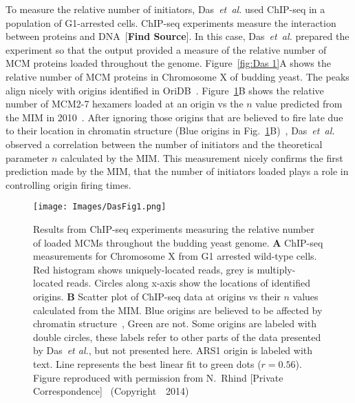 {		To measure the relative number of initiators, Das~\emph{et~al.} used ChIP-seq in a population of G1-arrested cells.
		ChIP-seq experiments measure the interaction between proteins and DNA~[\textbf{Find Source}].
		In this case, Das~\emph{et~al.} prepared the experiment so that the output provided a measure of the relative number of MCM proteins loaded throughout the genome.
		Figure~\ref{fig:Das	1}A shows the relative number of MCM proteins in Chromosome X of budding yeast.
		The peaks align nicely with origins identified in OriDB~\cite{OriDB}.
		Figure~\ref{fig:Das1}B shows the relative number of MCM2-7 hexamers loaded at an origin vs the $n$ value predicted from the MIM in 2010~\cite{ScottsPaper}.
		After ignoring those origins that are believed to fire late due to their location in chromatin structure (Blue origins in Fig.~\ref{fig:Das1}B)~\cite{Chromatin}, Das~\emph{et~al.} observed a correlation between the number of initiators and the theoretical parameter $n$ calculated by the MIM.
		This measurement nicely confirms the first prediction made by the MIM, that the number of initiators loaded plays a role in controlling origin firing times.
		
		\begin{figure}[tbh]
			\begin{center}
				\texttt{[image: Images/DasFig1.png]}
			\end{center}
				\caption[Relative amounts of loaded MCM]{\label{fig:Das1} Results from ChIP-seq experiments measuring the relative number of loaded MCMs throughout the budding yeast genome.
					\textbf{A} ChIP-seq measurements for Chromosome X from G1 arrested wild-type cells.
					Red histogram shows uniquely-located reads, grey is multiply-located reads.
					Circles along x-axis show the locations of identified origins.
					\textbf{B} Scatter plot of ChIP-seq data at origins vs their $n$ values calculated from the MIM.
					Blue origins are believed to be affected by chromatin structure~\cite{Chromatin}, Green are not.
					Some origins are labeled with double circles, these labels refer to other parts of the data presented by Das~\emph{et al.}, but not presented here.
					ARS1 origin is labeled with text.
					Line represents the best linear fit to green dots ($r=0.56$).
					Figure reproduced with permission from N.~Rhind [Private Correspondence]~\cite{Rhind} (Copyright~\textcopyright~2014)}
		\end{figure}
\clearpage
		
}
